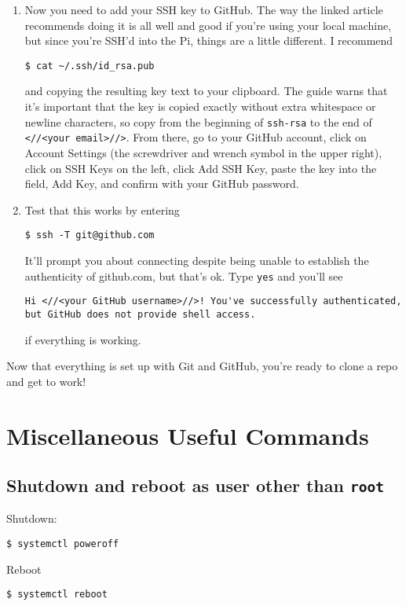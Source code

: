 \documentclass[12pt,letterpaper]{article}
\begin{document}
\begin{enumerate}
\begin{enumerate}
		\item Now you need to add your SSH key to GitHub.  The way the linked
		  article recommends doing it is all well and good if you're using your
		  local machine, but since you're SSH'd into the Pi, things are a
		  little different.  I recommend
		  \begin{lstlisting}
$ cat ~/.ssh/id_rsa.pub
          \end{lstlisting}
		  and copying the resulting key text to your clipboard.  The guide
		  warns that it's important that the key is copied exactly without
		  extra whitespace or newline characters, so copy from the beginning of
		  \lstinline{ssh-rsa} to the end of \lstinline{<//<your email>//>}.
		  From there, go to your GitHub account, click on Account Settings (the
		  screwdriver and wrench symbol in the upper right), click on SSH Keys
		  on the left, click Add SSH Key, paste the key into the field, Add
		  Key, and confirm with your GitHub password.
		\item Test that this works by entering
		  \begin{lstlisting}
$ ssh -T git@github.com		  
		  \end{lstlisting}
		  It'll prompt you about connecting despite being unable to establish
		  the authenticity of github.com, but that's ok.  Type \lstinline{yes}
		  and you'll see
		  \begin{lstlisting}
Hi <//<your GitHub username>//>! You've successfully authenticated, but GitHub does not provide shell access.
		  \end{lstlisting}
		  if everything is working.
		\end{enumerate}
		Now that everything is set up with Git and GitHub, you're ready to
		clone a repo and get to work!
\end{enumerate}


\section{Miscellaneous Useful Commands}

\subsection{Shutdown and reboot as user other than \lstinline{root}}
Shutdown:
\begin{lstlisting}
$ systemctl poweroff
\end{lstlisting}

Reboot
\begin{lstlisting}
$ systemctl reboot
\end{lstlisting}
\end{document}
